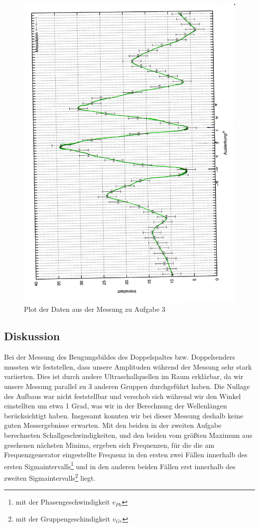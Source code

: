 \documentclass[12pt]{scrartcl}
\begin{document}
\begin{figure}[H] 
  \centering
    \includegraphics[scale = 0.5, angle = -91]{aufgabe_3_b.pdf}
  	\caption[Plot der Daten aus der Messung zu Aufgabe 3]{Plot der Daten aus der Messung zu Aufgabe 3}
  \label{fig:plot}
\end{figure}
\subsection{Diskussion}
Bei der Messung des Beugungsbildes des Doppelspaltes bzw. Doppelsenders mussten wir feststellen, dass unsere Amplituden während der Messung sehr stark variierten. Dies ist durch andere Ultraschallquellen im Raum erklärbar, da wir unsere Messung parallel zu 3 anderen Gruppen durchgeführt haben. Die Nullage des Aufbaus war nicht feststellbar und verschob sich während wir den Winkel einstellten um etwa 1 Grad, was wir in der Berechnung der Wellenlängen berücksichtigt haben. Insgesamt konnten wir bei dieser Messung deshalb keine guten Messergebnisse erwarten. Mit den beiden in der zweiten Aufgabe berechneten Schallgeschwindigkeiten, und den beiden vom größten Maximum aus gesehenen nächsten Minima, ergeben sich Frequenzen, für die die am Frequenzgenerator eingestellte Frequenz in den ersten zwei Fällen innerhalb des ersten Sigmaintervalls\footnote{mit der Phasengeschwindigkeit $v_{Ph}$} und in den anderen beiden Fällen erst innerhalb des zweiten Sigmaintervalls\footnote{mit der Gruppengeschindigkeit $v_{Gr}$} liegt.
\end{document}
